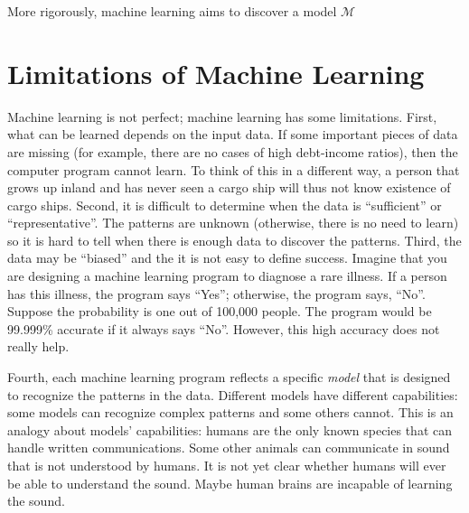 More rigorously, machine learning aims to discover
a model $\mathcal{M}$ 


\section{Limitations of Machine Learning}

Machine learning is not perfect; machine learning has some
limitations.  First, what can be learned depends on the input data. If
some important pieces of data are missing (for example, there are no
cases of high debt-income ratios), then the computer program cannot
learn.  To think of this in a different way, a person that grows up
inland and has never seen a cargo ship will thus not know existence of
cargo ships.  Second, it is difficult to determine when the data is
``sufficient'' or ``representative''.  The patterns are unknown
(otherwise, there is no need to learn) so it is hard to tell when
there is enough data to discover the patterns.  Third, the data may be
``biased'' and the it is not easy to define success. Imagine that you
are designing a machine learning program to diagnose a rare illness.
If a person has this illness, the program says ``Yes''; otherwise, the
program says, ``No''.  Suppose the probability is one out of 100,000
people.  The program would be 99.999\% accurate if it always says
``No''.  However, this high accuracy does not really help.

Fourth, each machine learning program reflects a specific {\it model}
that is designed to recognize the patterns in the data.  Different
models have different capabilities: some models can recognize complex
patterns and some others cannot.  This is an analogy about models'
capabilities: humans are the only known species that can handle
written communications.  Some other animals can communicate in sound
that is not understood by humans. It is not yet clear whether humans
will ever be able to understand the sound.  Maybe human brains are
incapable of learning the sound.

